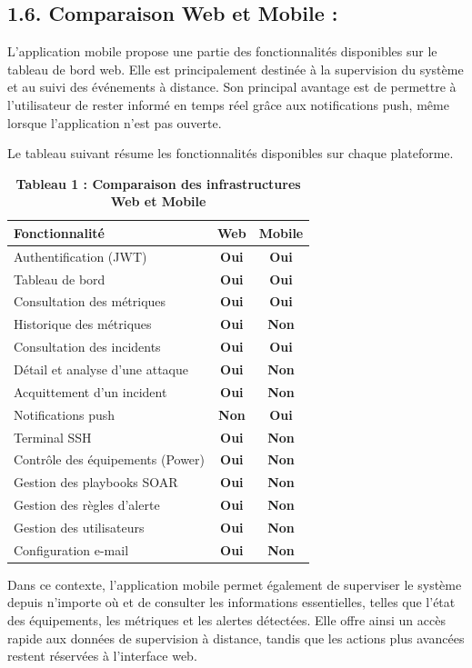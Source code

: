 \documentclass[12pt,a4paper]{report}
\newcommand{\yes}{\textcolor{green!50!black}{\textbf{Oui}}}
\newcommand{\pfenon}{\textcolor{red!75!black}{\textbf{Non}}}
\begin{document}
\subsection*{1.6. Comparaison Web et Mobile :}
L’application mobile propose une partie des fonctionnalités disponibles sur le tableau de bord web. Elle est principalement destinée à la supervision du système et au suivi des événements à distance. Son principal avantage est de permettre à l’utilisateur de rester informé en temps réel grâce aux notifications push, même lorsque l’application n’est pas ouverte.\par
Le tableau suivant résume les fonctionnalités disponibles sur chaque plateforme.\par
\begin{table}[H]
\centering
\caption*{\textbf{Tableau 1 : Comparaison des infrastructures Web et Mobile}}
\renewcommand{\arraystretch}{1.18}
\begin{tabular}{|p{}|c|c|}
\hline
\rowcolor{gray!25}\textbf{Fonctionnalité} & \textbf{Web} & \textbf{Mobile}\\ \hline
Authentification (JWT) & \yes & \yes\\ \hline
Tableau de bord & \yes & \yes\\ \hline
Consultation des métriques & \yes & \yes\\ \hline
Historique des métriques & \yes & \pfenon\\ \hline
Consultation des incidents & \yes & \yes\\ \hline
Détail et analyse d'une attaque & \yes & \pfenon\\ \hline
Acquittement d'un incident & \yes & \pfenon\\ \hline
Notifications push & \pfenon & \yes\\ \hline
Terminal SSH & \yes & \pfenon\\ \hline
Contrôle des équipements (Power) & \yes & \pfenon\\ \hline
Gestion des playbooks SOAR & \yes & \pfenon\\ \hline
Gestion des règles d'alerte & \yes & \pfenon\\ \hline
Gestion des utilisateurs & \yes & \pfenon\\ \hline
Configuration e-mail & \yes & \pfenon\\ \hline
\end{tabular}
\end{table}
Dans ce contexte, l’application mobile permet également de superviser le système depuis n’importe où et de consulter les informations essentielles, telles que l’état des équipements, les métriques et les alertes détectées. Elle offre ainsi un accès rapide aux données de supervision à distance, tandis que les actions plus avancées restent réservées à l’interface web.\par
\clearpage
\end{document}
